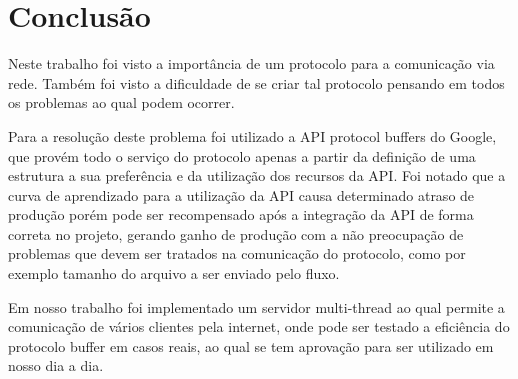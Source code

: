 \documentclass[
	11pt,				%
	oneside,			%
	a4paper,			%
	english,			%
	brazil,				%
	]{article}
\begin{document}
\section{Conclusão} \label{sec:conc}
Neste trabalho foi visto a importância de um protocolo para a comunicação via rede. Também foi visto a dificuldade de se criar tal protocolo pensando em todos os problemas ao qual podem ocorrer.

Para a resolução deste problema foi utilizado a API protocol buffers do Google, que provém todo o serviço do protocolo apenas a partir da definição de uma estrutura a sua preferência e da utilização dos recursos da API. Foi notado que a curva de aprendizado para a utilização da API causa determinado atraso de produção porém pode ser recompensado após a integração da API de forma correta no projeto, gerando ganho de produção com a não preocupação de problemas que devem ser tratados na comunicação do protocolo, como por exemplo tamanho do arquivo a ser enviado pelo fluxo. 

Em nosso trabalho foi implementado um servidor multi-thread ao qual permite a comunicação de vários clientes pela internet, onde pode ser testado a eficiência do protocolo buffer em casos reais, ao qual se tem aprovação para ser utilizado em nosso dia a dia.
\end{document}
